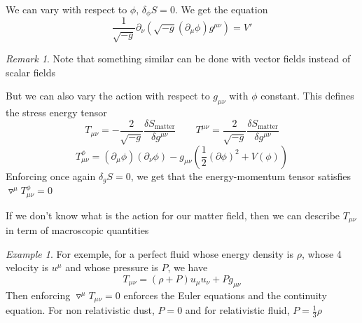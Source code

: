 \documentclass[a4paper]{book}
\theoremstyle{definition}
\theoremstyle{remark}
\newtheorem*{remark}{Remark}
\newtheorem*{example}{Example}
\begin{document}
We can vary with respect to $\phi$, $\delta_\phi S = 0$. We get the equation 
\begin{equation}
    \frac{1}{\sqrt{-g}}\partial_\nu (\sqrt{-g}(\partial_\mu \phi)g^{\mu\nu}) = V'
\end{equation}
\begin{remark}
    Note that something similar can be done with vector fields instead of scalar fields
\end{remark}
But we can also vary the action with respect to $g_{\mu\nu}$ with $\phi$ constant. This defines the stress energy tensor 
\begin{equation}
    T_{\mu\nu} = -\frac{2}{\sqrt{-g}}\frac{\delta S_{\text{matter}}}{\delta g^{\mu\nu}} \qquad  T^{\mu\nu} = \frac{2}{\sqrt{-g}}\frac{\delta S_{\text{matter}}}{\delta g^{\mu\nu}} 
\end{equation}
\begin{equation}
    T^\phi_{\mu\nu} = (\partial_\mu\phi)(\partial_\nu \phi) - g_{\mu\nu}\left(\frac{1}{2}(\partial \phi)^2 + V(\phi)\right)
\end{equation}
Enforcing once again $\delta_g S = 0$, we get that the energy-momentum tensor satisfies $\triangledown^\mu T^\phi_{\mu\nu} = 0$ \par \medskip 

If we don't know what is the action for our matter field, then we can describe $T_{\mu\nu}$ in term of macroscopic quantities

\begin{example}
    For exemple, for a perfect fluid whose energy density is $\rho$, whose 4 velocity is $u^\mu$ and whose pressure is $P$, we have 
    \begin{equation}
        T_{\mu\nu} = (\rho + P)u_\mu u_\nu + Pg_{\mu\nu}
    \end{equation}
    Then enforcing $\triangledown^\mu T_{\mu\nu} = 0$ enforces the Euler equations and the continuity equation. For non relativistic dust, $P = 0$ and for relativistic fluid, $P = \frac{1}{3}\rho$
\end{example}
\end{document}
